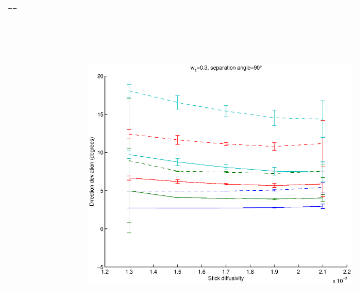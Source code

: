 \documentclass{article}
\begin{document}
\begin{figure}[H]
\begin{adjustwidth}{-\oddsidemargin}{-\rightmargin}
\begin{subfigure}{0.8\paperwidth}
\begin{subfigure}{0.3\textwidth}
      \end{subfigure}
      ~
      \begin{subfigure}{0.3\textwidth}
        \centering
        \includegraphics[width=\textwidth]{figures/synth_modbas_weights__snr=20__w1=3__angle=90.eps}
      \end{subfigure}
    \end{subfigure}
    

\end{adjustwidth}
\end{figure}
\end{document}
